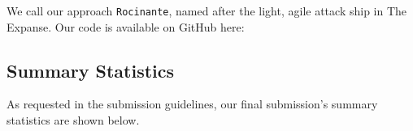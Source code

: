\documentclass[twoside]{article}
\begin{document}
We call our approach \texttt{Rocinante}, named after the light, agile attack
ship in The Expanse. Our code is available on GitHub here:

\begin{center}
\end{center}


\subsection*{Summary Statistics}
As requested in the submission guidelines, our final submission's summary
statistics are shown below.
\begin{center}
\end{center}




\end{document}
